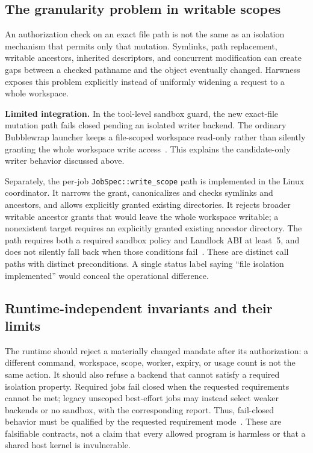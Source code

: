 \subsection{The granularity problem in writable scopes}

An authorization check on an exact file path is not the same as an isolation mechanism that permits only that mutation. Symlinks, path replacement, writable ancestors, inherited descriptors, and concurrent modification can create gaps between a checked pathname and the object eventually changed. Harwness exposes this problem explicitly instead of uniformly widening a request to a whole workspace.

\textbf{Limited integration.} In the tool-level sandbox guard, the new exact-file mutation path fails closed pending an isolated writer backend. The ordinary Bubblewrap launcher keeps a file-scoped workspace read-only rather than silently granting the whole workspace write access~\cite{ref32,ref33}. This explains the candidate-only writer behavior discussed above.

Separately, the per-job \texttt{JobSpec::write\_scope} path is implemented in the Linux coordinator. It narrows the grant, canonicalizes and checks symlinks and ancestors, and allows explicitly granted existing directories. It rejects broader writable ancestor grants that would leave the whole workspace writable; a nonexistent target requires an explicitly granted existing ancestor directory. The path requires both a required sandbox policy and Landlock ABI at least~5, and does not silently fall back when those conditions fail~\cite{ref34}. These are distinct call paths with distinct preconditions. A single status label saying ``file isolation implemented'' would conceal the operational difference.

\subsection{Runtime-independent invariants and their limits}

The runtime should reject a materially changed mandate after its authorization: a different command, workspace, scope, worker, expiry, or usage count is not the same action. It should also refuse a backend that cannot satisfy a required isolation property. Required jobs fail closed when the requested requirements cannot be met; legacy unscoped best-effort jobs may instead select weaker backends or no sandbox, with the corresponding report. Thus, fail-closed behavior must be qualified by the requested requirement mode~\cite{ref35}. These are falsifiable contracts, not a claim that every allowed program is harmless or that a shared host kernel is invulnerable.


